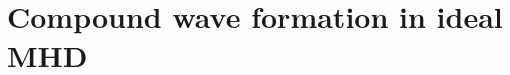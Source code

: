 \documentclass{beamer}
\begin{document}


\section{Compound wave formation in ideal MHD}
\end{document}
